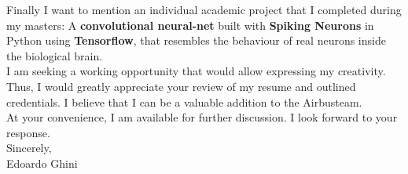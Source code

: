 \documentclass[11pt]{article}
\newcommand{\company}{Airbus}
\begin{document}
\begin{FlushLeft}
Finally I want to mention an individual academic project that I completed during my masters:
  A \textbf{convolutional neural-net} built with \textbf{Spiking Neurons} in Python using \textbf{Tensorflow}, that resembles the behaviour of real neurons inside the biological brain.\\
I am seeking a working opportunity that would allow expressing my creativity.
Thus, I would greatly appreciate your review of my resume and outlined credentials.
I believe that I can be a valuable addition to the \company team.\\\smallskip
At your convenience, I am available for further discussion. I look forward to your response.\\\bigskip
Sincerely,\\
Edoardo Ghini
\end{FlushLeft}
\end{document}
